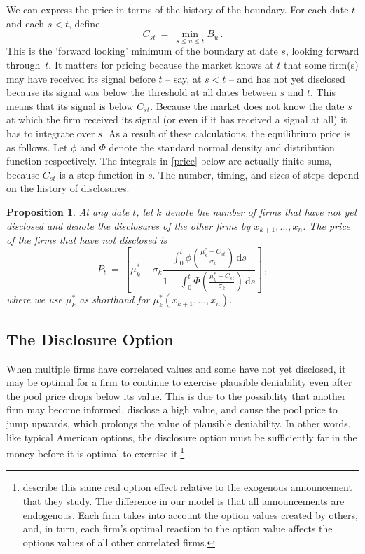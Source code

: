 \documentclass[authoryear,letterpaper,english,12pt]{elsarticle}
\theoremstyle{plain}
\newtheorem{proposition}{Proposition}
\numberwithin{lemma}{section}
\numberwithin{proposition}{section}
\numberwithin{equation}{section}
\numberwithin{figure}{section}
\newcommand{\D}{\mathrm{d}}
\begin{document}
We can express the price in terms of the history of the boundary.  For each date $t$ and each $s<t$, define
$$C_{st} \ = \  \min_{s\le u \le t} B_u\,.$$
This is the `forward looking' minimum of the boundary at date $s$, looking forward through~$t$.  It matters for pricing because the market knows at $t$ that some firm(s) may have received its signal before $t$ -- say, at $s<t$ -- and has not yet disclosed because its signal was below the threshold at all dates between $s$ and $t$.  This means that its signal is below $C_{st}$.  Because the market does not know the date $s$ at which the firm received its signal (or even if it has received a signal at all) it has to integrate over $s$.  As a result of these calculations, the equilibrium price is as follows.  Let $\phi$ and $\Phi$ denote the standard normal density and distribution function respectively.  The integrals in \eqref{price} below are actually finite sums, because $C_{st}$ is a step function in $s$.  The number, timing, and sizes of steps depend on the history of disclosures.  

\begin{proposition}\label{prop:price}
At any date $t$, let $k$ denote the number of firms that have not yet disclosed and denote the disclosures of the other firms by $x_{k+1},\ldots, x_n$.  
The price of the firms that have not disclosed is
\begin{equation}\label{price}
P_t \ = \  \left[\mu^*_k - \sigma_k\frac{\int_0^t \phi\left(\frac{\mu^*_k-C_{st}}{\sigma_k}\right)\,\D s}{1 - \int_0^t \Phi\left(\frac{\mu^*_k-C_{st}}{\sigma_k}\right)\,\D s}\right]\,,
\end{equation}
where we use $\mu^*_k$ as shorthand for $\mu^*_k(x_{k+1},\ldots, x_n)$.  
\end{proposition} 

\subsection{The Disclosure Option}\label{ss:option}

When multiple firms have correlated values and some have not yet disclosed, it may be optimal for a firm to continue to exercise plausible deniability even after the pool price drops below its value. This is due to the possibility that another firm may become informed, disclose a high value, and cause the pool price to jump upwards, which prolongs the value of plausible deniability.  In other words, like typical American options, the disclosure option must be sufficiently far in the money before it is optimal to exercise it.\footnote{\citet*{adk} describe this same real option effect relative to the exogenous announcement that they study.  The difference in our model is that all announcements are endogenous.  Each firm takes into account the option values created by others, and, in turn, each firm's optimal reaction to the option value affects the options values of all other correlated firms.}
\end{document}
